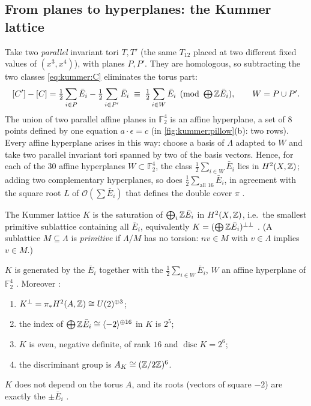 \subsection{From planes to hyperplanes: the Kummer lattice}

Take two \emph{parallel} invariant tori $T,T'$ (the same $T_{12}$ placed at two different
fixed values of $(x^3,x^4)$), with planes $P,P'$. They are homologous, so subtracting the
two classes \eqref{eq:kummer:C} eliminates the torus part:
\begin{equation}\label{eq:kummer:halfW}
  [C']-[C]=\tfrac12\sum_{i\in P}\bar E_i-\tfrac12\sum_{i\in P'}\bar E_i
  \;\equiv\;\tfrac12\sum_{i\in W}\bar E_i\pmod{\textstyle\bigoplus\mathbb{Z}\bar E_i},
  \qquad W=P\cup P' .
\end{equation}
The union of two parallel affine planes in $\mathbb{F}_2^4$ is an affine hyperplane, a set of
$8$ points defined by one equation $a\cdot\epsilon=c$ (in \cref{fig:kummer:pillow}(b): two
rows). Every affine hyperplane arises in this way: choose a basis of $\Lambda$ adapted to
$W$ and take two parallel invariant tori spanned by two of the basis vectors.
Hence, for each of the $30$ affine hyperplanes $W\subset\mathbb{F}_2^4$, the class
$\frac12\sum_{i\in W}\bar E_i$ lies in $H^2(X,\mathbb{Z})$; adding two complementary hyperplanes, so
does $\frac12\sum_{\text{all }16}\bar E_i$, in agreement with the square root $L$ of
$\mathcal{O}(\sum\bar E_i)$ that defines the double cover $\pi$ .

\begin{definition}\label{def:kummer:K}
The Kummer lattice $K$ is the saturation of $\bigoplus_i\mathbb{Z}\bar E_i$ in $H^2(X,\mathbb{Z})$, i.e.\ the
smallest primitive sublattice containing all $\bar E_i$, equivalently
$K=(\bigoplus\mathbb{Z}\bar E_i)^{\perp\perp}$ .
(A sublattice $M\subseteq\Lambda$ is \emph{primitive} if
$\Lambda/M$ has no torsion: $nv\in M$ with $v\in\Lambda$ implies $v\in M$.)
\end{definition}

\begin{theorem}\label{thm:kummer:K}
$K$ is generated by the $\bar E_i$ together with the $\frac12\sum_{i\in W}\bar E_i$, $W$ an
affine hyperplane of $\mathbb{F}_2^4$ . Moreover
:
\begin{enumerate}[label=(\roman*),itemsep=1pt]
\item $K^\perp=\pi_*H^2(A,\mathbb{Z})\cong U(2)^{\oplus3}$;
\item the index of $\bigoplus\mathbb{Z}\bar E_i\cong\langle-2\rangle^{\oplus16}$ in $K$ is $2^5$;
\item $K$ is even, negative definite, of rank $16$ and $\operatorname{disc}K=2^6$;
\item the discriminant group is $A_K\cong(\mathbb{Z}/2\mathbb{Z})^6$.
\end{enumerate}
$K$ does not depend on the torus $A$, and its roots (vectors of square $-2$) are exactly the
$\pm\bar E_i$ .
\end{theorem}

